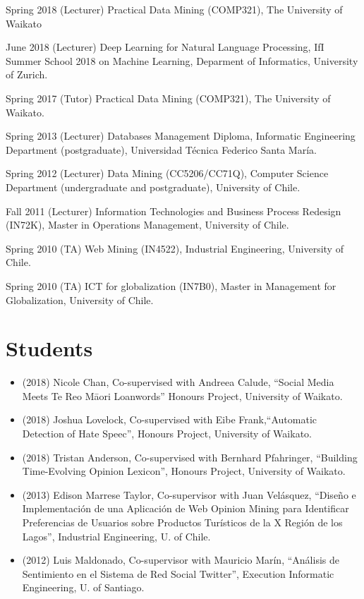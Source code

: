 \documentclass[letterpaper]{article}
\begin{document}
\begin{CV}



\item [Spring 2018] (Lecturer) Practical Data Mining (COMP321), The University of Waikato

\item [June 2018] (Lecturer) Deep Learning for Natural Language Processing, IfI Summer School 2018 on Machine Learning,  Deparment of Informatics, University of Zurich. 

\item[Spring 2017] (Tutor) Practical Data Mining (COMP321), The University of Waikato.

\item[Spring 2013] (Lecturer) Databases Management Diploma, Informatic Engineering Department (postgraduate), Universidad Técnica Federico Santa María.

\item[Spring 2012] (Lecturer) Data Mining (CC5206/CC71Q), Computer Science Department (undergraduate and postgraduate), University of Chile.

\item[Fall 2011]   (Lecturer) Information Technologies and Business Process Redesign (IN72K), Master in Operations Management, University of Chile.

\item[Spring 2010]  (TA) Web Mining (IN4522), Industrial Engineering, University of Chile.

\item[Spring 2010]  (TA) ICT for globalization (IN7B0), Master in Management for Globalization, University of Chile.


\end{CV}

\section{Students}
\begin{itemize}

\item (2018) Nicole Chan, Co-supervised with Andreea Calude, ``Social Media Meets Te Reo Māori Loanwords''  Honours Project, University of Waikato. 
\item  (2018)  Joshua Lovelock, Co-supervised with Eibe Frank,``Automatic Detection of Hate Speec'', Honours Project, University of Waikato.
\item  (2018) Tristan Anderson, Co-supervised with Bernhard Pfahringer, ``Building Time-Evolving Opinion Lexicon'', Honours Project, University of Waikato.
\item (2013) Edison Marrese Taylor, Co-supervisor with Juan Velásquez, ``Diseño e Implementación de una Aplicación de Web Opinion Mining para Identificar Preferencias de Usuarios sobre Productos Turísticos de la X Región de los Lagos'', Industrial Engineering, U. of Chile.
\item (2012) Luis Maldonado, Co-supervisor with Mauricio Marín, ``Análisis de Sentimiento en el Sistema de Red Social Twitter'', Execution Informatic Engineering, U. of Santiago.

\end{itemize}
\end{document}
